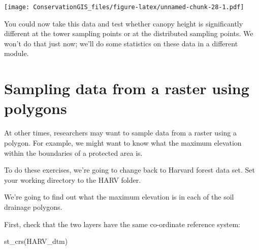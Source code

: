 \documentclass[
]{book}
\newenvironment{Shaded}{\begin{snugshade}}{\end{snugshade}}
\newcommand{\FunctionTok}[1]{\textcolor[rgb]{0.00,0.00,0.00}{#1}}
\newcommand{\NormalTok}[1]{#1}
\begin{document}
\texttt{[image: ConservationGIS\_files/figure-latex/unnamed-chunk-28-1.pdf]}

You could now take this data and test whether canopy height is significantly different at the tower sampling points or at the distributed sampling points. We won't do that just now; we'll do some statistics on these data in a different module.

\hypertarget{sampling-data-from-a-raster-using-polygons}{%
\section{Sampling data from a raster using polygons}\label{sampling-data-from-a-raster-using-polygons}}

At other times, researchers may want to sample data from a raster using a polygon. For example, we might want to know what the maximum elevation within the boundaries of a protected area is.

To do these exercises, we're going to change back to Harvard forest data set. Set your working directory to the HARV folder.

We're going to find out what the maximum elevation is in each of the soil drainage polygons.

First, check that the two layers have the same co-ordinate reference system:

\begin{Shaded}
\begin{Highlighting}[]
\FunctionTok{st\_crs}\NormalTok{(HARV\_dtm)}
\end{Highlighting}
\end{Shaded}
\end{document}
